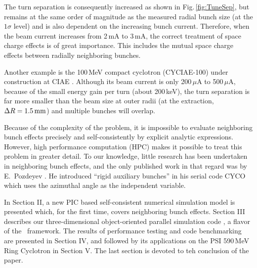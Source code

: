 \documentclass[aps,prstab,onecolumn,superscriptaddress,showpacs]{revtex4}
\begin{document}
The turn separation is consequently increased as shown in Fig.\,\ref{fig:TuneSep}, but remains at the same order of magnitude as the measured radial bunch size (at the $1\sigma$ level) and is also dependent on the increasing bunch current.
Therefore, when the beam current increases from 2\,mA to 3\,mA, the correct treatment of space charge effects is of great importance. This includes
the mutual space charge effects between radially neighboring bunches.


Another example is the 100\,MeV compact cyclotron (CYCIAE-100) under construction at CIAE \cite{Zhang:1}. Although its beam current is only 200\,$\mu$A to 500\,$\mu$A,
because of the small energy gain per turn (about 200\,keV), the turn separation is far more smaller than the beam size at outer radii (at the extraction, $\Delta R = 1.5\RM{\,mm}$) and multiple bunches will overlap.

Because of the complexity of the problem, it is impossible to evaluate neighboring bunch effects precisely and self-consistently by explicit 
analytic expressions. However, high performance computation (HPC) makes it possible to 
treat this problem in greater detail. To our knowledge, little research has been undertaken in neighboring bunch effects, 
and the only published work in that regard was by 
E.~Pozdeyev \cite{Poz:1}. He introduced ``rigid auxiliary bunches'' in his serial code CYCO which uses the azimuthal angle as the independent variable. 

In Section II, a new PIC based self-consistent numerical simulation model is presented which, for the first time, covers neighboring bunch effects. 
Section III describes our three-dimensional object-oriented parallel simulation code \opalcycl, a flavor of the \opal \  framework. 
The results of performance testing and code benchmarking are presented in Section IV, 
and followed by its applications on the PSI 590\,MeV Ring Cyclotron in Section V. 
The last section is devoted to teh conclusion of the paper. 
\end{document}
